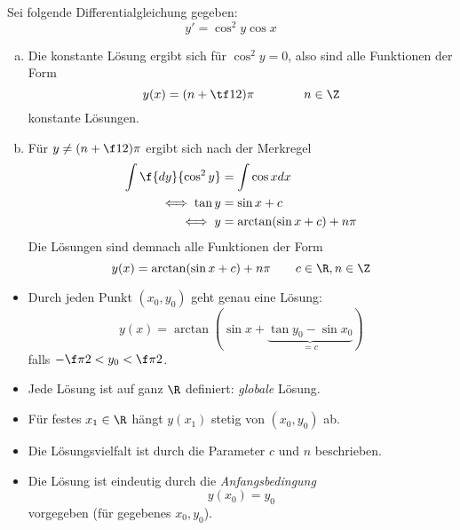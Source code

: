 \documentclass[a4paper,10pt]{scrbook}
\begin{document}
\begin{ex} \label{2.2}
	Sei folgende Differentialgleichung gegeben:
	\[
		y' = \cos^2 y \cos x
	\]
	\begin{enumerate}[a)]
		\item
			Die konstante Lösung ergibt sich für $\cos^2 y = 0$, also sind alle Funktionen der Form
			\[
				y(x) = (n + \tf 12) \pi \qquad \qquad n \in \Z
			\]
			konstante Lösungen.
		\item
			Für $y \neq (n + \f 12) \pi$ ergibt sich nach der Merkregel
			\begin{align*}
				\int \f {dy}{\cos^2 y} &= \int \cos x dx \\
				\iff \tan y &= \sin x + c \\
				\iff y &= \arctan(\sin x + c) + n \pi
			\end{align*}
			Die Lösungen sind demnach alle Funktionen der Form
			\[
				y(x) = \arctan(\sin x + c) + n \pi \qquad c \in \R, n \in \Z
			\]
	\end{enumerate}
	\begin{note}[Beobachtungen]
		\begin{itemize}
			\item
				Durch jeden Punkt $(x_0, y_0)$ geht genau eine Lösung:
				\[
					y(x) = \arctan(\sin x + \underbrace{\tan y_0 - \sin x_0}_{=c})
				\]
				falls $- \f \pi 2 < y_0 < \f \pi 2$.
			\item
				Jede Lösung ist auf ganz $\R$ definiert: \emph{globale} Lösung.
			\item
				Für festes $x_1 \in \R$ hängt $y(x_1)$ stetig von $(x_0, y_0)$ ab.
			\item
				Die Lösungsvielfalt ist durch die Parameter $c$ und $n$ beschrieben.
			\item
				Die Lösung ist eindeutig durch die \emph{Anfangsbedingung}
				\[
					y(x_0) = y_0 
				\]
				vorgegeben (für gegebenes $x_0, y_0$).
		\end{itemize}
	\end{note}
\end{ex}
\end{document}
